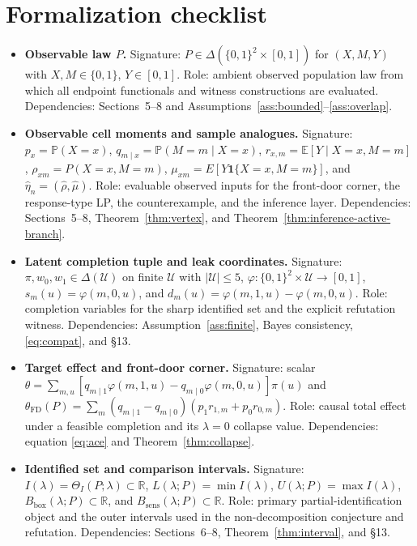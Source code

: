 \documentclass[11pt]{article}
\newcommand{\E}{\mathbb{E}}
\renewcommand{\Pr}{\mathbb{P}}
\newcommand{\one}{\mathbf{1}}
\theoremstyle{definition}
\theoremstyle{plain}
\theoremstyle{remark}
\begin{document}
\section{Formalization checklist}
\begin{itemize}
  \item \textbf{Observable law \(P\).} Signature: \(P\in\Delta(\{0,1\}^2\times[0,1])\) for \((X,M,Y)\) with \(X,M\in\{0,1\}\), \(Y\in[0,1]\). Role: ambient observed population law from which all endpoint functionals and witness constructions are evaluated. Dependencies: Sections~5--8 and Assumptions~\ref{ass:bounded}--\ref{ass:overlap}.
  \item \textbf{Observable cell moments and sample analogues.} Signature: \(p_x=\Pr(X=x)\), \(q_{m\mid x}=\Pr(M=m\mid X=x)\), \(r_{x,m}=\E[Y\mid X=x,M=m]\), \(\rho_{xm}=P(X=x,M=m)\), \(\mu_{xm}=E[Y\one\{X=x,M=m\}]\), and \(\widehat\eta_n=(\widehat\rho,\widehat\mu)\). Role: evaluable observed inputs for the front-door corner, the response-type LP, the counterexample, and the inference layer. Dependencies: Sections~5--8, Theorem~\ref{thm:vertex}, and Theorem~\ref{thm:inference-active-branch}.
  \item \textbf{Latent completion tuple and leak coordinates.} Signature: \(\pi,w_0,w_1\in\Delta(\mathcal U)\) on finite \(\mathcal U\) with \(|\mathcal U|\le5\), \(\varphi:\{0,1\}^2\times\mathcal U\to[0,1]\), \(s_m(u)=\varphi(m,0,u)\), and \(d_m(u)=\varphi(m,1,u)-\varphi(m,0,u)\). Role: completion variables for the sharp identified set and the explicit refutation witness. Dependencies: Assumption~\ref{ass:finite}, Bayes consistency, \eqref{eq:compat}, and \S13.
  \item \textbf{Target effect and front-door corner.} Signature: scalar \(\theta=\sum_{m,u}[q_{m\mid1}\varphi(m,1,u)-q_{m\mid0}\varphi(m,0,u)]\pi(u)\) and \(\theta_{\mathrm{FD}}(P)=\sum_m(q_{m\mid1}-q_{m\mid0})(p_1r_{1,m}+p_0r_{0,m})\). Role: causal total effect under a feasible completion and its \(\lambda=0\) collapse value. Dependencies: equation \eqref{eq:ace} and Theorem~\ref{thm:collapse}.
  \item \textbf{Identified set and comparison intervals.} Signature: \(I(\lambda)=\Theta_I(P;\lambda)\subset\mathbb R\), \(L(\lambda;P)=\min I(\lambda)\), \(U(\lambda;P)=\max I(\lambda)\), \(B_{\mathrm{box}}(\lambda;P)\subset\mathbb R\), and \(B_{\mathrm{sens}}(\lambda;P)\subset\mathbb R\). Role: primary partial-identification object and the outer intervals used in the non-decomposition conjecture and refutation. Dependencies: Sections~6--8, Theorem~\ref{thm:interval}, and \S13.

\end{itemize}
\end{document}
